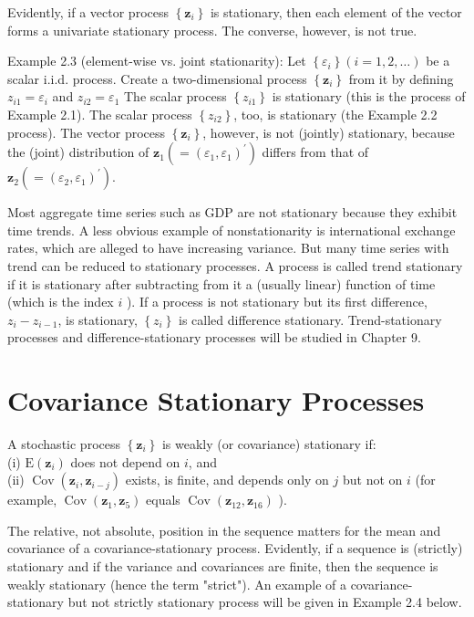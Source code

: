\documentclass[10pt]{article}
\begin{document}
Evidently, if a vector process $\left\{\mathbf{z}_{i}\right\}$ is stationary, then each element of the vector forms a univariate stationary process. The converse, however, is not true.

Example 2.3 (element-wise vs. joint stationarity): Let $\left\{\varepsilon_{i}\right\}(i=1,2, \ldots)$ be a scalar i.i.d. process. Create a two-dimensional process $\left\{\mathbf{z}_{i}\right\}$ from it by defining $z_{i 1}=\varepsilon_{i}$ and $z_{i 2}=\varepsilon_{1}$ The scalar process $\left\{z_{i 1}\right\}$ is stationary (this is the process of Example 2.1). The scalar process $\left\{z_{i 2}\right\}$, too, is stationary (the Example 2.2 process). The vector process $\left\{\mathbf{z}_{i}\right\}$, however, is not (jointly) stationary, because the (joint) distribution of $\mathbf{z}_{1}\left(=\left(\varepsilon_{1}, \varepsilon_{1}\right)^{\prime}\right)$ differs from that of $\mathbf{z}_{2}\left(=\left(\varepsilon_{2}, \varepsilon_{1}\right)^{\prime}\right)$.

Most aggregate time series such as GDP are not stationary because they exhibit time trends. A less obvious example of nonstationarity is international exchange rates, which are alleged to have increasing variance. But many time series with trend can be reduced to stationary processes. A process is called trend stationary if it is stationary after subtracting from it a (usually linear) function of time (which is the index $i$ ). If a process is not stationary but its first difference, $z_{i}-z_{i-1}$, is stationary, $\left\{z_{i}\right\}$ is called difference stationary. Trend-stationary processes and difference-stationary processes will be studied in Chapter 9.

\section*{Covariance Stationary Processes}
A stochastic process $\left\{\mathbf{z}_{i}\right\}$ is weakly (or covariance) stationary if:\\
(i) $\mathrm{E}\left(\mathbf{z}_{i}\right)$ does not depend on $i$, and\\
(ii) $\operatorname{Cov}\left(\mathbf{z}_{i}, \mathbf{z}_{i-j}\right)$ exists, is finite, and depends only on $j$ but not on $i$ (for example, $\operatorname{Cov}\left(\mathbf{z}_{1}, \mathbf{z}_{5}\right)$ equals $\operatorname{Cov}\left(\mathbf{z}_{12}, \mathbf{z}_{16}\right)$ ).

The relative, not absolute, position in the sequence matters for the mean and covariance of a covariance-stationary process. Evidently, if a sequence is (strictly) stationary and if the variance and covariances are finite, then the sequence is weakly stationary (hence the term "strict"). An example of a covariance-stationary but not strictly stationary process will be given in Example 2.4 below.
\end{document}
